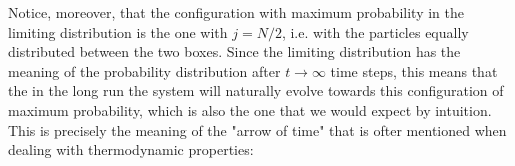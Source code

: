 Notice, moreover, that the configuration with maximum probability in the limiting distribution is the one with $j = N/2$, i.e. with the particles equally distributed between the two boxes. Since the limiting distribution has the meaning of the probability distribution after $t\rightarrow \infty$ time steps, this means that the in the long run the system will naturally evolve towards this configuration of maximum probability, which is also the one that we would expect by intuition. This is precisely the meaning of the "arrow of time" that is ofter mentioned when dealing with thermodynamic properties: 